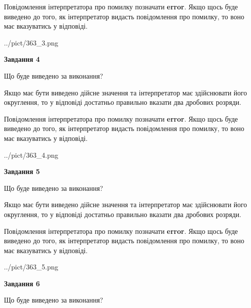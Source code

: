 \documentclass[12pt, ukrainian]{article}
\begin{document}
{\begin {Large}
Повідомлення інтерпретатора про помилку позначати \textbf{error}.
Якщо щось буде виведено до того, як інтерпретатор видасть повідомлення про помилку, 
то воно має вказуватись у відповіді. \par

\begin{center}
	{../pict/363_3.png}
\end{center}
\newpage

{\begin {center}\textbf{Завдання 4}\end {center}}\par
Що буде виведено за виконання? \par

Якщо має бути виведено дійсне значення та інтерпретатор має здійснювати його округлення, 
то у відповіді достатньо правильно вказати два дробових розряди.

Повідомлення інтерпретатора про помилку позначати \textbf{error}.
Якщо щось буде виведено до того, як інтерпретатор видасть повідомлення про помилку, 
то воно має вказуватись у відповіді. \par

\begin{center}
	{../pict/363_4.png}
\end{center}
\newpage

{\begin {center}\textbf{Завдання 5}\end {center}}\par
Що буде виведено за виконання? \par

Якщо має бути виведено дійсне значення та інтерпретатор має здійснювати його округлення, 
то у відповіді достатньо правильно вказати два дробових розряди.

Повідомлення інтерпретатора про помилку позначати \textbf{error}.
Якщо щось буде виведено до того, як інтерпретатор видасть повідомлення про помилку, 
то воно має вказуватись у відповіді. \par

\begin{center}
	{../pict/363_5.png}
\end{center}
\newpage

{\begin {center}\textbf{Завдання 6}\end {center}}\par
Що буде виведено за виконання? \par


\end{Large}}
\end{document}
